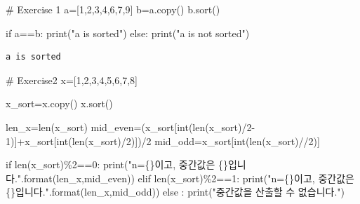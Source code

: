 \documentclass[
  a4paper,
  DIV=11,
  numbers=noendperiod]{scrreprt}
\newenvironment{Shaded}{\begin{snugshade}}{\end{snugshade}}
\newcommand{\BuiltInTok}[1]{\textcolor[rgb]{0.00,0.23,0.31}{#1}}
\newcommand{\CommentTok}[1]{\textcolor[rgb]{0.37,0.37,0.37}{#1}}
\newcommand{\ControlFlowTok}[1]{\textcolor[rgb]{0.00,0.23,0.31}{#1}}
\newcommand{\DecValTok}[1]{\textcolor[rgb]{0.68,0.00,0.00}{#1}}
\newcommand{\NormalTok}[1]{\textcolor[rgb]{0.00,0.23,0.31}{#1}}
\newcommand{\OperatorTok}[1]{\textcolor[rgb]{0.37,0.37,0.37}{#1}}
\newcommand{\SpecialCharTok}[1]{\textcolor[rgb]{0.37,0.37,0.37}{#1}}
\newcommand{\StringTok}[1]{\textcolor[rgb]{0.13,0.47,0.30}{#1}}
\begin{document}
\begin{Shaded}
\begin{Highlighting}[]
\CommentTok{\# Exercise 1}
\NormalTok{a}\OperatorTok{=}\NormalTok{[}\DecValTok{1}\NormalTok{,}\DecValTok{2}\NormalTok{,}\DecValTok{3}\NormalTok{,}\DecValTok{4}\NormalTok{,}\DecValTok{6}\NormalTok{,}\DecValTok{7}\NormalTok{,}\DecValTok{9}\NormalTok{]}
\NormalTok{b}\OperatorTok{=}\NormalTok{a.copy()}
\NormalTok{b.sort()}

\ControlFlowTok{if}\NormalTok{ a}\OperatorTok{==}\NormalTok{b:}
    \BuiltInTok{print}\NormalTok{(}\StringTok{"a is sorted"}\NormalTok{)}
\ControlFlowTok{else}\NormalTok{:}
    \BuiltInTok{print}\NormalTok{(}\StringTok{"a is not sorted"}\NormalTok{)}
\end{Highlighting}
\end{Shaded}

\begin{verbatim}
a is sorted
\end{verbatim}

\begin{Shaded}
\begin{Highlighting}[]
\CommentTok{\# Exercise2}
\NormalTok{x}\OperatorTok{=}\NormalTok{[}\DecValTok{1}\NormalTok{,}\DecValTok{2}\NormalTok{,}\DecValTok{3}\NormalTok{,}\DecValTok{4}\NormalTok{,}\DecValTok{5}\NormalTok{,}\DecValTok{6}\NormalTok{,}\DecValTok{7}\NormalTok{,}\DecValTok{8}\NormalTok{]}

\NormalTok{x\_sort}\OperatorTok{=}\NormalTok{x.copy()}
\NormalTok{x.sort()}

\NormalTok{len\_x}\OperatorTok{=}\BuiltInTok{len}\NormalTok{(x\_sort)}
\NormalTok{mid\_even}\OperatorTok{=}\NormalTok{(x\_sort[}\BuiltInTok{int}\NormalTok{(}\BuiltInTok{len}\NormalTok{(x\_sort)}\OperatorTok{/}\DecValTok{2}\OperatorTok{{-}}\DecValTok{1}\NormalTok{)]}\OperatorTok{+}\NormalTok{x\_sort[}\BuiltInTok{int}\NormalTok{(}\BuiltInTok{len}\NormalTok{(x\_sort)}\OperatorTok{/}\DecValTok{2}\NormalTok{)])}\OperatorTok{/}\DecValTok{2}
\NormalTok{mid\_odd}\OperatorTok{=}\NormalTok{x\_sort[}\BuiltInTok{int}\NormalTok{(}\BuiltInTok{len}\NormalTok{(x\_sort)}\OperatorTok{//}\DecValTok{2}\NormalTok{)]}

\ControlFlowTok{if} \BuiltInTok{len}\NormalTok{(x\_sort)}\OperatorTok{\%}\DecValTok{2}\OperatorTok{==}\DecValTok{0}\NormalTok{:}
    \BuiltInTok{print}\NormalTok{(}\StringTok{"n=}\SpecialCharTok{\{\}}\StringTok{이고, 중간값은 }\SpecialCharTok{\{\}}\StringTok{입니다."}\NormalTok{.}\BuiltInTok{format}\NormalTok{(len\_x,mid\_even))}
\ControlFlowTok{elif} \BuiltInTok{len}\NormalTok{(x\_sort)}\OperatorTok{\%}\DecValTok{2}\OperatorTok{==}\DecValTok{1}\NormalTok{:}
    \BuiltInTok{print}\NormalTok{(}\StringTok{"n=}\SpecialCharTok{\{\}}\StringTok{이고, 중간값은 }\SpecialCharTok{\{\}}\StringTok{입니다."}\NormalTok{.}\BuiltInTok{format}\NormalTok{(len\_x,mid\_odd))}
\ControlFlowTok{else}\NormalTok{ :}
    \BuiltInTok{print}\NormalTok{(}\StringTok{"중간값을 산출할 수 없습니다."}\NormalTok{)}
\end{Highlighting}
\end{Shaded}
\end{document}
